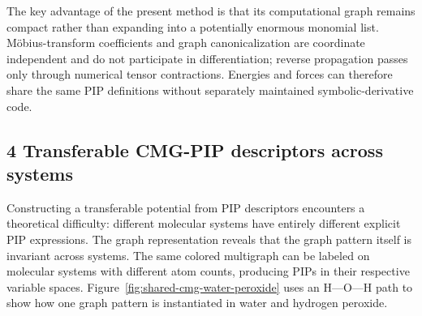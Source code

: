 The key advantage of the present method is that its computational graph remains compact rather than expanding into a potentially enormous monomial list. M\"obius-transform coefficients and graph canonicalization are coordinate independent and do not participate in differentiation; reverse propagation passes only through numerical tensor contractions. Energies and forces can therefore share the same PIP definitions without separately maintained symbolic-derivative code.

\subsection{4 Transferable CMG-PIP descriptors across systems}\label{sec:transferable-descriptors}

Constructing a transferable potential from PIP descriptors encounters a theoretical difficulty: different molecular systems have entirely different explicit PIP expressions. The graph representation reveals that the graph pattern itself is invariant across systems. The same colored multigraph can be labeled on molecular systems with different atom counts, producing PIPs in their respective variable spaces. Figure~\ref{fig:shared-cmg-water-peroxide} uses an H---O---H path to show how one graph pattern is instantiated in water and hydrogen peroxide.

